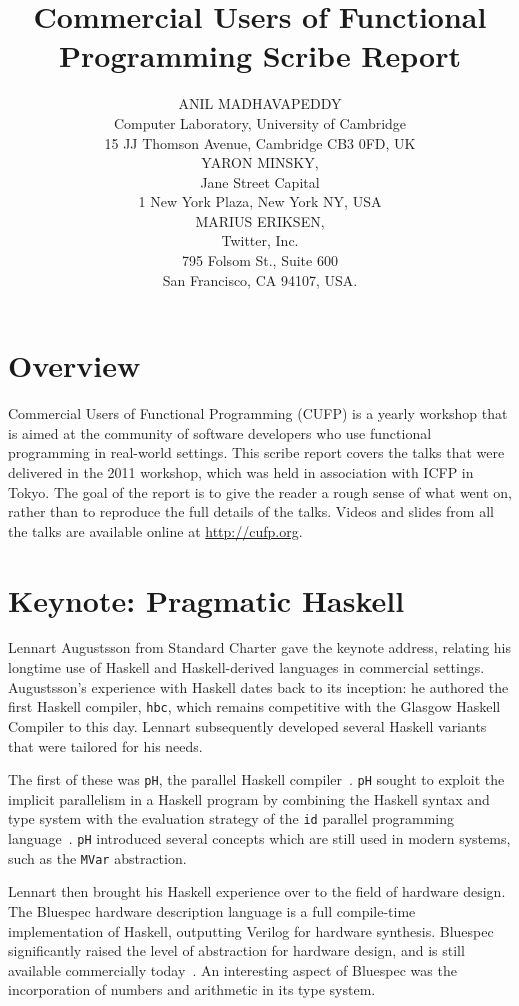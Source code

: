 \documentclass{jfp1}
\title[Commercial Users of Functional Programming 2011]
      {Commercial Users of Functional Programming Scribe Report}
\author[Anil Madhavapeddy, Yaron Minsky and Marius Eriksen]
       {ANIL MADHAVAPEDDY\\
        Computer Laboratory, University of Cambridge\\ 
        15 JJ Thomson Avenue, Cambridge CB3 0FD, UK\\
 YARON MINSKY,\\
        Jane Street Capital\\
        1 New York Plaza, New York NY, USA\\ 
 MARIUS ERIKSEN,\\
        Twitter, Inc.\\
        795 Folsom St., Suite 600\\
        San Francisco, CA 94107, USA.
        }
\begin{document}
\label{firstpage}
\maketitle

\section{Overview}

Commercial Users of Functional Programming (CUFP) is a yearly workshop
that is aimed at the community of software developers who use functional
programming in real-world settings.  This scribe report covers the talks
that were delivered in the 2011 workshop, which was held in association
with ICFP in Tokyo.  The goal of the report is to give the reader
a rough sense of what went on, rather than to reproduce the full details
of the talks.  Videos and slides from all the talks are available online at \url{http://cufp.org}.

\section{Keynote: Pragmatic Haskell}

Lennart Augustsson from Standard Charter gave the keynote address,
relating his longtime use of Haskell and Haskell-derived languages in
commercial settings.  Augustsson's experience with Haskell dates back to
its inception: he authored the first Haskell compiler, {\tt hbc}, which
remains competitive with the Glasgow Haskell Compiler to this
day. Lennart subsequently developed several Haskell variants that were
tailored for his needs.

The first of these was {\tt pH}, the parallel Haskell
compiler~\cite{Aditya95semanticsof}. {\tt pH} sought to exploit the implicit
parallelism in a Haskell program by combining the Haskell syntax and type
system with the evaluation strategy of the {\tt id} parallel programming
language~\cite{arvindid}.  {\tt pH} introduced several concepts which are still
used in modern systems, such as the {\tt MVar} abstraction.

Lennart then brought his Haskell experience over to the field of hardware
design.  The Bluespec hardware description language is a full compile-time
implementation of Haskell, outputting Verilog for hardware synthesis.  Bluespec
significantly raised the level of abstraction for hardware design, and is still
available commercially today~\cite{Nikhil:2008:BLU:1862867.1862868}.  An
interesting aspect of Bluespec was the incorporation of numbers and arithmetic
in its type system.
\end{document}
